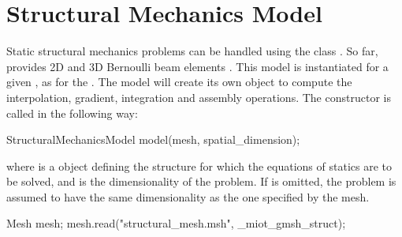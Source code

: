 \chapter{Structural  Mechanics   Model}
Static structural mechanics problems can be handled using the
class .  So far, \akantu provides 2D and 3D
Bernoulli beam elements \cite{frey2009}.  This model is instantiated for a given
, as for the .  The model will create its own  object to
compute the interpolation, gradient, integration and assembly
operations.  The  constructor is called
in the following way:

\begin{cpp}
  StructuralMechanicsModel model(mesh, spatial_dimension);
\end{cpp}
where  is a  object defining the structure for
which the equations of statics are to be solved, and
 is the dimensionality of the problem.  If
 is omitted, the problem is assumed to have
the same dimensionality as the one specified by the mesh.



\begin{cpp}
  Mesh mesh;
  mesh.read("structural_mesh.msh", _miot_gmsh_struct);
\end{cpp}

